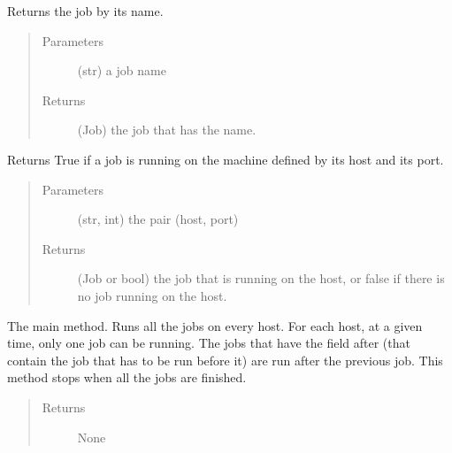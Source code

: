 \documentclass[a4paper,10pt,english]{sphinxmanual}
\begin{document}
\begin{fulllineitems}
\begin{fulllineitems}
\label{\detokenize{apidoc_commands/commands:commands.jobs.Jobs.find_job_that_has_name}}
Returns the job by its name.
\begin{quote}\begin{description}
\item[{Parameters}] \leavevmode
{} \textendash{} (str) a job name

\item[{Returns}] \leavevmode
(Job) the job that has the name.

\end{description}\end{quote}

\end{fulllineitems}


\begin{fulllineitems}
\label{\detokenize{apidoc_commands/commands:commands.jobs.Jobs.is_occupied}}
Returns True if a job is running on 
the machine defined by its host and its port.
\begin{quote}\begin{description}
\item[{Parameters}] \leavevmode
{} \textendash{} (str, int) the pair (host, port)

\item[{Returns}] \leavevmode
(Job or bool) 
the job that is running on the host, 
or false if there is no job running on the host.

\end{description}\end{quote}

\end{fulllineitems}


\begin{fulllineitems}
\label{\detokenize{apidoc_commands/commands:commands.jobs.Jobs.run_jobs}}
The main method. Runs all the jobs on every host. 
For each host, at a given time, only one job can be running.
The jobs that have the field after (that contain the job that has
to be run before it) are run after the previous job.
This method stops when all the jobs are finished.
\begin{quote}\begin{description}
\item[{Returns}] \leavevmode
None


\end{description}
\end{quote}
\end{fulllineitems}
\end{fulllineitems}
\end{document}
